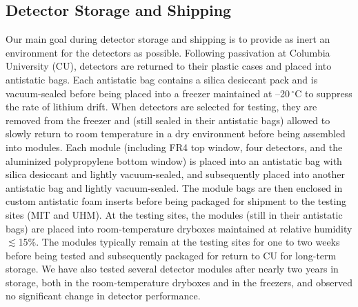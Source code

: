 \documentclass[journal]{IEEEtran}
\begin{document}
\subsection{Detector Storage and Shipping}
Our main goal during detector storage and shipping is to provide as inert an environment for the detectors as possible. Following passivation at Columbia University (CU), detectors are returned to their plastic cases and placed into antistatic bags. Each antistatic bag contains a silica desiccant pack and is vacuum-sealed before being placed into a freezer maintained at --20$\,^\circ\text{C}$ to suppress the rate of lithium drift. When detectors are selected for testing, they are removed from the freezer and (still sealed in their antistatic bags) allowed to slowly return to room temperature in a dry environment before being assembled into modules. Each module (including FR4 top window, four detectors, and the aluminized polypropylene bottom window) is placed into an antistatic bag with silica desiccant and lightly vacuum-sealed, and subsequently placed into another antistatic bag and lightly vacuum-sealed. The module bags are then enclosed in custom antistatic foam inserts before being packaged for shipment to the testing sites (MIT and UHM). At the testing sites, the modules (still in their antistatic bags) are placed into room-temperature dryboxes maintained at relative humidity $\lesssim$15\%. The modules typically remain at the testing sites for one to two weeks before being tested and subsequently packaged for return to CU for long-term storage. We have also tested several detector modules after nearly two years in storage, both in the room-temperature dryboxes and in the freezers, and observed no significant change in detector performance.
%
\end{document}
